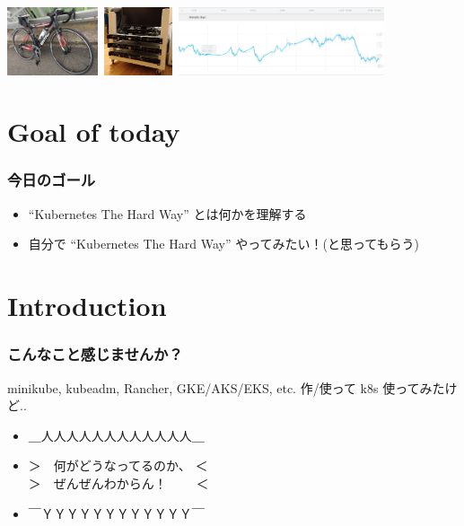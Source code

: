 \documentclass[aspectratio=169,11pt,hyperref={colorlinks=true}]{beamer}
\begin{document}
\begin{frame}
\begin{itemize}
    \includegraphics[height=20mm]{images/my-bike.jpg}~\includegraphics[height=20mm]{images/server_front.jpg}~\includegraphics[height=20mm]{images/my-weight.png}
  \end{itemize}
\end{frame}

\section{Goal of today}
\begin{frame}
  \frametitle{今日のゴール}
  \begin{itemize}
    \item ``Kubernetes The Hard Way'' とは何かを理解する
    \item 自分で ``Kubernetes The Hard Way'' やってみたい！(と思ってもらう)
  \end{itemize}
\end{frame}

\section{Introduction}
\begin{frame}
  \frametitle{こんなこと感じませんか？}
  minikube, kubeadm, Rancher, GKE/AKS/EKS, etc. 作/使って k8s 使ってみたけど..
  \begin{itemize}
    \item[] \Huge{＿人人人人人人人人人人人人＿}
    \item[] \Huge{＞　何がどうなってるのか、 ＜ \\ ＞　ぜんぜんわからん！　　 ＜}
    \item[] \Huge{￣ＹＹＹＹＹＹＹＹＹＹＹＹ￣}
  \end{itemize}
\end{frame}
\end{document}
